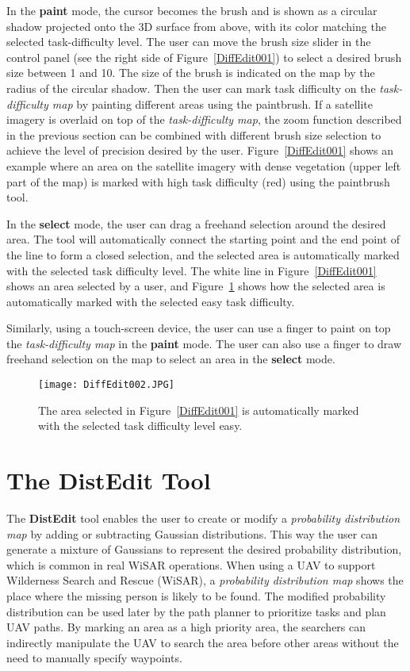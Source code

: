 In the \textbf{paint} mode, the cursor becomes the brush and is shown as a circular shadow projected onto the 3D surface from above, with its color matching the selected task-difficulty level. The user can move the brush size slider in the control panel (see the right side of Figure~\ref{DiffEdit001}) to select a desired brush size between 1 and 10. The size of the brush is indicated on the map by the radius of the circular shadow. Then the user can mark task difficulty on the \textit{task-difficulty map} by painting different areas using the paintbrush. If a satellite imagery is overlaid on top of the \textit{task-difficulty map}, the zoom function described in the previous section can be combined with different brush size selection to achieve the level of precision desired by the user. Figure~\ref{DiffEdit001} shows an example where an area on the satellite imagery with dense vegetation (upper left part of the map) is marked with high task difficulty (red) using the paintbrush tool.

In the \textbf{select} mode, the user can drag a freehand selection around the desired area. The tool will automatically connect the starting point and the end point of the line to form a closed selection, and the selected area is automatically marked with the selected task difficulty level. The white line in Figure~\ref{DiffEdit001} shows an area selected by a user, and Figure~\ref{DiffEdit002} shows how the selected area is automatically marked with the selected easy task difficulty.

Similarly, using a touch-screen device, the user can use a finger to paint on top the \textit{task-difficulty map} in the \textbf{paint} mode. The user can also use a finger to draw freehand selection on the map to select an area in the \textbf{select} mode.


\begin{figure}
\centering
\texttt{[image: DiffEdit002.JPG]}
\caption{The area selected in Figure~\ref{DiffEdit001} is automatically marked with the selected task difficulty level easy.}
\label{DiffEdit002}
\end{figure}

\section{The DistEdit Tool}
\label{DistEdit}

The \textbf{DistEdit} tool enables the user to create or modify a \textit{probability distribution map} by adding or subtracting Gaussian distributions. This way the user can generate a mixture of Gaussians to represent the desired probability distribution, which is common in real WiSAR operations.  When using a UAV to support Wilderness Search and Rescue (WiSAR), a \textit{probability distribution map} shows the place where the missing person is likely to be found. The modified probability distribution can be used later by the path planner to prioritize tasks and plan UAV paths. By marking an area as a high priority area, the searchers can indirectly manipulate the UAV to search the area before other areas without the need to manually specify waypoints.

